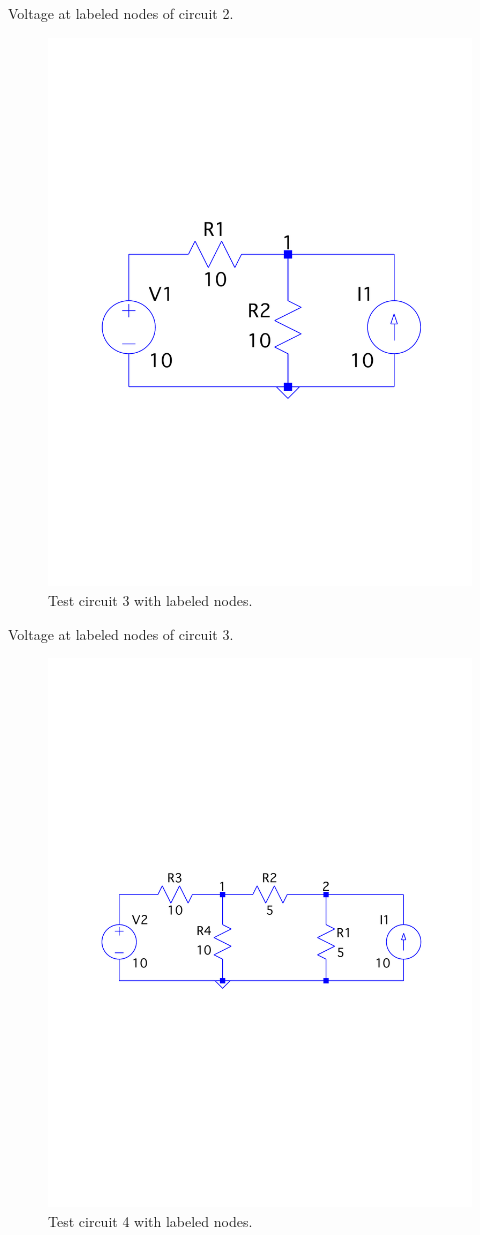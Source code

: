 \documentclass[a4paper,titlepage]{article}
\begin{document}
	\begin{table}[!htb]
		\centering
		\caption{Voltage at labeled nodes of circuit 2.}
		\label{table:q1_circuit_2}
	\end{table}
	
	\begin{figure}[!htb]
		\centering
		\includegraphics[width=0.5\columnwidth]{plots/q1_circuit_3.pdf}
		\caption
		{Test circuit 3 with labeled nodes.}
		\label{fig:q1_circuit_3}
	\end{figure}
	
	\begin{table}[!htb]
		\centering
		\caption{Voltage at labeled nodes of circuit 3.}
		\label{table:q1_circuit_3}
	\end{table}
	
	\begin{figure}[!htb]
		\centering
		\includegraphics[width=0.75\columnwidth]{plots/q1_circuit_4.pdf}
		\caption
		{Test circuit 4 with labeled nodes.}
		\label{fig:q1_circuit_4}
	\end{figure}
	
\end{document}
